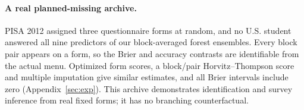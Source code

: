 \paragraph{A real planned-missing archive.}
PISA 2012 assigned three questionnaire forms at random, and no U.S. student answered all nine predictors of our block-averaged forest ensembles. Every block pair appears on a form, so the Brier and accuracy contrasts are identifiable from the actual menu. Optimized form scores, a block/pair Horvitz--Thompson score and multiple imputation give similar estimates, and all Brier intervals include zero (Appendix~\ref{sec:exp}). This archive demonstrates identification and survey inference from real fixed forms; it has no branching counterfactual.
